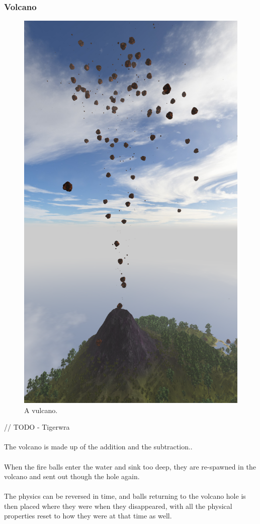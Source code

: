 \subsubsection{Volcano}
\begin{figure}[H]
  \centering
  \includegraphics[width=0.8\linewidth]{images/volcano.png}
  \caption{A vulcano.}
  \label{fig:vulcano}
\end{figure}%
// TODO - Tigerwra\\
\\
The volcano is made up of the addition and the subtraction..\\
\\
When the fire balls enter the water and sink too deep, they are re-spawned in the volcano and sent out though the hole again.
\\
\\
The physics can be reversed in time, and balls returning to the volcano hole is then placed where they were when they disappeared, with all the physical properties reset to how they were at that time as well.
